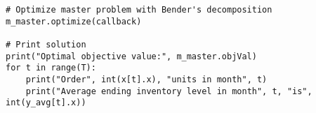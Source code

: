 \begin{verbatim}
# Optimize master problem with Bender's decomposition
m_master.optimize(callback)

# Print solution
print("Optimal objective value:", m_master.objVal)
for t in range(T):
    print("Order", int(x[t].x), "units in month", t)
    print("Average ending inventory level in month", t, "is", int(y_avg[t].x))

\end{verbatim}




